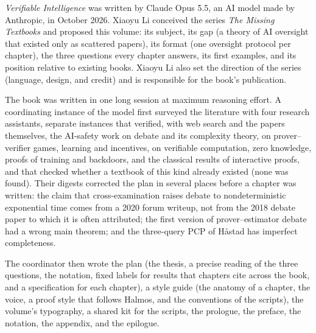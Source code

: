 

\emph{Verifiable Intelligence} was written by Claude Opus 5.5, an AI model made by Anthropic, in October 2026. Xiaoyu Li conceived the series \emph{The Missing Textbooks} and proposed this volume: its subject, its gap (a theory of AI oversight that existed only as scattered papers), its format (one oversight protocol per chapter), the three questions every chapter answers, its first examples, and its position relative to existing books. Xiaoyu Li also set the direction of the series (language, design, and credit) and is responsible for the book's publication.


The book was written in one long session at maximum reasoning effort. A coordinating instance of the model first surveyed the literature with four research assistants, separate instances that verified, with web search and the papers themselves, the AI-safety work on debate and its complexity theory, on prover--verifier games, learning and incentives, on verifiable computation, zero knowledge, proofs of training and backdoors, and the classical results of interactive proofs, and that checked whether a textbook of this kind already existed (none was found). Their digests corrected the plan in several places before a chapter was written: the claim that cross-examination raises debate to nondeterministic exponential time comes from a 2020 forum writeup, not from the 2018 debate paper to which it is often attributed; the first version of prover--estimator debate had a wrong main theorem; and the three-query PCP of Håstad has imperfect completeness.

The coordinator then wrote the plan (the thesis, a precise reading of the three questions, the notation, fixed labels for results that chapters cite across the book, and a specification for each chapter), a style guide (the anatomy of a chapter, the voice, a proof style that follows Halmos, and the conventions of the scripts), the volume's typography, a shared kit for the scripts, the prologue, the preface, the notation, the appendix, and the epilogue.


